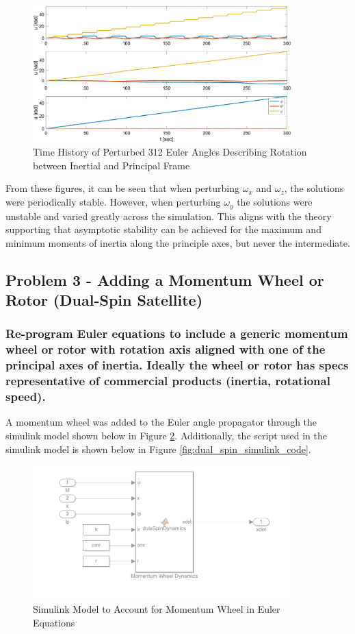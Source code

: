 \begin{figure}[H]
    \centering
    \captionsetup{justification = centering}
    \includegraphics[width = 10cm]{Images/PS4/stability_history_angles.png}
    \caption{Time History of Perturbed 312 Euler Angles Describing Rotation between Inertial and Principal Frame}
    \label{fig:stability_angles}
\end{figure}

From these figures, it can be seen that when perturbing $\omega_x$ and $\omega_z$, the solutions were periodically stable. However, when perturbing $\omega_y$ the solutions were unstable and varied greatly across the simulation. This aligns with the theory supporting that asymptotic stability can be achieved for the maximum and minimum moments of inertia along the principle axes, but never the intermediate.

\subsection{Problem 3 - Adding a Momentum Wheel or Rotor (Dual-Spin Satellite)}

\subsubsection{Re-program Euler equations to include a generic momentum wheel or rotor with rotation axis
aligned with one of the principal axes of inertia. Ideally the wheel or rotor has specs representative
of commercial products (inertia, rotational speed).}

A momentum wheel was added to the Euler angle propagator through the simulink model shown below in Figure \ref{fig:dual_spin_simulink}. Additionally, the script used in the simulink model is shown below in Figure \ref{fig:dual_spin_simulink_code}.

\begin{figure} [H]
    \centering
    \captionsetup{justification = centering}
    \includegraphics[width = 10cm]{Images/PS4/dualspin_simulink.png}
    \caption{Simulink Model to Account for Momentum Wheel in Euler Equations}
    \label{fig:dual_spin_simulink}
\end{figure}

